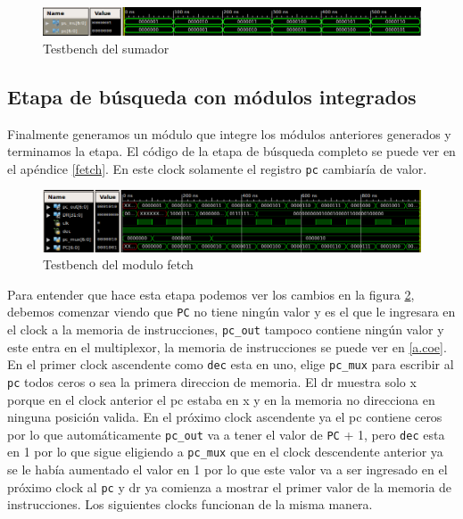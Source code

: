 \begin{figure}[H]
\centering
\includegraphics[scale=0.45]{Capitulo01/sum_test}
\caption{Testbench del sumador}
\label{fig:sumt}
\end{figure}


\subsection{Etapa de búsqueda con módulos integrados}
Finalmente generamos un m\'odulo que integre los módulos anteriores generados y terminamos la etapa. El código de la etapa de búsqueda completo se puede ver en el apéndice \ref{fetch}. En este clock solamente el registro \texttt{pc} cambiaría de valor. 

\begin{figure}[H]
\centering
\includegraphics[scale=0.45]{Capitulo01/fetch_test}
\caption{Testbench del modulo fetch}
\label{fig:fetcht}
\end{figure}

Para entender que hace esta etapa podemos ver los cambios en la figura \ref{fig:fetcht}, debemos comenzar viendo que \texttt{PC} no tiene ningún valor y es el que le ingresara en el clock a la memoria de instrucciones, \texttt{pc\_out} tampoco contiene ningún valor y este entra en el multiplexor, la memoria de instrucciones se puede ver en \ref{a.coe}.  
En el primer clock ascendente como \texttt{dec} esta en uno, elige \texttt{pc\_mux} para escribir al \texttt{pc} todos ceros o sea la primera direccion de memoria. El \ac{dr}  muestra  solo x porque en el clock anterior el \ac{pc} estaba en x y en la memoria no direcciona en ninguna posición valida. En el próximo clock ascendente ya el \ac{pc} contiene ceros por lo que automáticamente \texttt{pc\_out} va a tener el valor de \texttt{PC} + 1, pero \texttt{dec} esta en 1 por lo que sigue eligiendo a \texttt{pc\_mux} que en el clock descendente anterior ya se le había aumentado el valor en 1 por lo que este valor va a ser ingresado en el próximo clock al \texttt{pc} y \ac{dr} ya comienza a mostrar el primer valor de la memoria de instrucciones. Los siguientes clocks funcionan de la misma manera.

